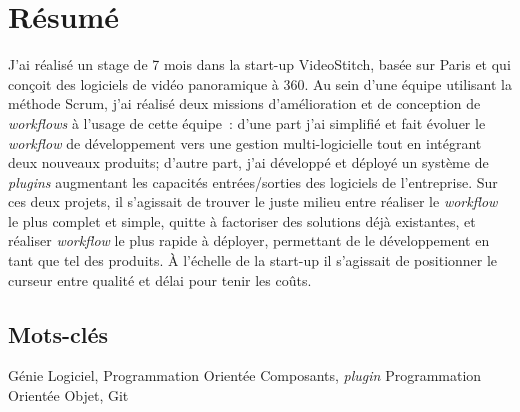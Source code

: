 \newpage
\section*{Résumé}
J'ai réalisé un stage de 7 mois dans la start-up VideoStitch, basée sur Paris et qui
conçoit des logiciels de vidéo panoramique à 360\degree. Au sein d'une équipe utilisant
la méthode Scrum, j'ai réalisé deux missions d'amélioration et de conception de
\textit{workflows} à l'usage de cette équipe~: d'une part j'ai simplifié et fait évoluer
le \textit{workflow} de développement vers une gestion multi-logicielle
tout en intégrant deux nouveaux produits; d'autre part, j'ai développé
et déployé un système de \textit{plugins} augmentant les capacités entrées/sorties
des logiciels de l'entreprise. Sur ces deux projets, il s'agissait de trouver le
juste milieu entre réaliser le \textit{workflow} le plus complet et simple, 
quitte à factoriser des solutions déjà existantes, et réaliser \textit{workflow} 
le plus rapide à déployer, permettant de le développement en tant que tel des produits. 
À l'échelle de la start-up il s'agissait de positionner le curseur entre qualité
et délai pour tenir les coûts.

\subsection*{Mots-clés}
Génie Logiciel, Programmation Orientée Composants, \textit{plugin}
Programmation Orientée Objet, Git 
